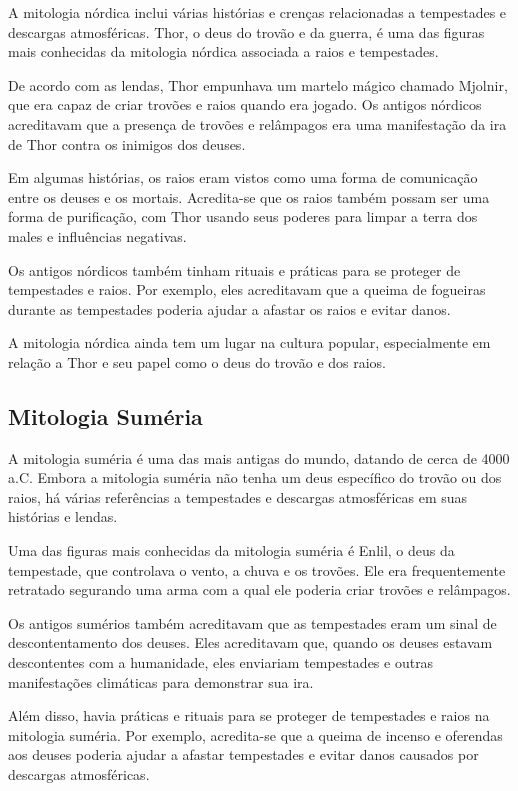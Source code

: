 \documentclass[a4paper, 12pt, onecolumn,singlespacing]{article}
\begin{document}
	A mitologia nórdica inclui várias histórias e crenças relacionadas a tempestades e descargas atmosféricas. Thor, o deus do trovão e da guerra, é uma das figuras mais conhecidas da mitologia nórdica associada a raios e tempestades.
	
	De acordo com as lendas, Thor empunhava um martelo mágico chamado Mjolnir, que era capaz de criar trovões e raios quando era jogado. Os antigos nórdicos acreditavam que a presença de trovões e relâmpagos era uma manifestação da ira de Thor contra os inimigos dos deuses.
	
	Em algumas histórias, os raios eram vistos como uma forma de comunicação entre os deuses e os mortais. Acredita-se que os raios também possam ser uma forma de purificação, com Thor usando seus poderes para limpar a terra dos males e influências negativas.
	
	Os antigos nórdicos também tinham rituais e práticas para se proteger de tempestades e raios. Por exemplo, eles acreditavam que a queima de fogueiras durante as tempestades poderia ajudar a afastar os raios e evitar danos.
	
	A mitologia nórdica ainda tem um lugar na cultura popular, especialmente em relação a Thor e seu papel como o deus do trovão e dos raios.
	
	\subsection{Mitologia Suméria}
	
	A mitologia suméria é uma das mais antigas do mundo, datando de cerca de 4000 a.C. Embora a mitologia suméria não tenha um deus específico do trovão ou dos raios, há várias referências a tempestades e descargas atmosféricas em suas histórias e lendas.
	
	Uma das figuras mais conhecidas da mitologia suméria é Enlil, o deus da tempestade, que controlava o vento, a chuva e os trovões. Ele era frequentemente retratado segurando uma arma com a qual ele poderia criar trovões e relâmpagos.
	
	Os antigos sumérios também acreditavam que as tempestades eram um sinal de descontentamento dos deuses. Eles acreditavam que, quando os deuses estavam descontentes com a humanidade, eles enviariam tempestades e outras manifestações climáticas para demonstrar sua ira.
	
	Além disso, havia práticas e rituais para se proteger de tempestades e raios na mitologia suméria. Por exemplo, acredita-se que a queima de incenso e oferendas aos deuses poderia ajudar a afastar tempestades e evitar danos causados por descargas atmosféricas.
	
\end{document}
